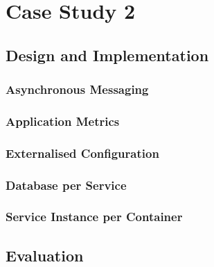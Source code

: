 \section{Case Study 2}



\subsection{Design and Implementation}

\subsubsection{Asynchronous Messaging}
\subsubsection{Application Metrics}
\subsubsection{Externalised Configuration}
\subsubsection{Database per Service}
\subsubsection{Service Instance per Container}

\subsection{Evaluation}
